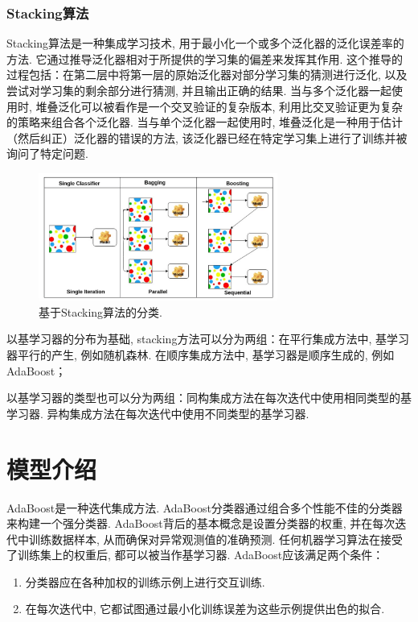 \documentclass[lang=cn,11pt]{elegantpaper}
\begin{document}
\subsubsection*{Stacking算法}
Stacking算法是一种集成学习技术, 用于最小化一个或多个泛化器的泛化误差率的方法. 它通过推导泛化器相对于所提供的学习集的偏差来发挥其作用. 这个推导的过程包括：在第二层中将第一层的原始泛化器对部分学习集的猜测进行泛化, 以及尝试对学习集的剩余部分进行猜测, 并且输出正确的结果. 当与多个泛化器一起使用时, 堆叠泛化可以被看作是一个交叉验证的复杂版本, 利用比交叉验证更为复杂的策略来组合各个泛化器. 当与单个泛化器一起使用时, 堆叠泛化是一种用于估计（然后纠正）泛化器的错误的方法, 该泛化器已经在特定学习集上进行了训练并被询问了特定问题. 
\begin{figure}[htbp]
  \centering
  \includegraphics[width=0.7\textwidth]{2}
  \caption{基于Stacking算法的分类.}
\end{figure}

以基学习器的分布为基础, stacking方法可以分为两组：在平行集成方法中, 基学习器平行的产生, 例如随机森林. 在顺序集成方法中, 基学习器是顺序生成的, 例如AdaBoost；

以基学习器的类型也可以分为两组：同构集成方法在每次迭代中使用相同类型的基学习器. 异构集成方法在每次迭代中使用不同类型的基学习器. 
\section{模型介绍}
AdaBoost是一种迭代集成方法. AdaBoost分类器通过组合多个性能不佳的分类器来构建一个强分类器. AdaBoost背后的基本概念是设置分类器的权重, 并在每次迭代中训练数据样本, 从而确保对异常观测值的准确预测. 任何机器学习算法在接受了训练集上的权重后, 都可以被当作基学习器. AdaBoost应该满足两个条件：
\begin{enumerate}
  \item 分类器应在各种加权的训练示例上进行交互训练. 
  \item 在每次迭代中, 它都试图通过最小化训练误差为这些示例提供出色的拟合. 
\end{enumerate}
\end{document}
